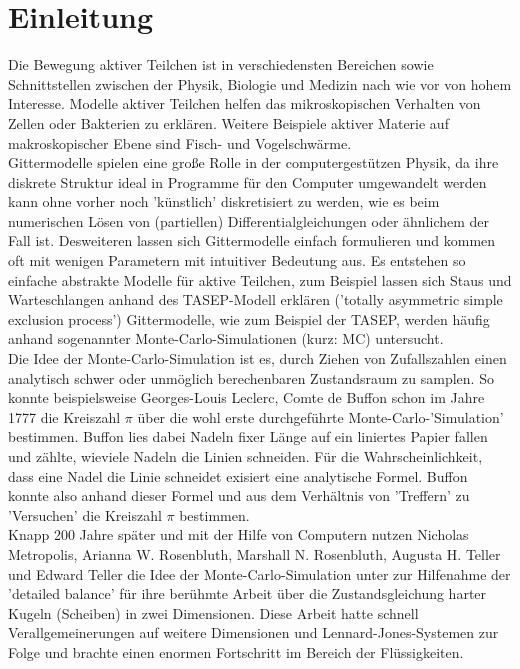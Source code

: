 \documentclass[a4paper, 12pt]{report}
\begin{document}
\chapter{Einleitung}
\renewcommand{\thepage}{\arabic{page}}\setcounter{page}{1}
Die Bewegung aktiver Teilchen ist in verschiedensten Bereichen sowie \break Schnittstellen zwischen der Physik, Biologie und Medizin nach wie vor von hohem Interesse. Modelle aktiver Teilchen helfen das mikroskopischen Verhalten von Zellen oder Bakterien zu erklären. Weitere Beispiele aktiver Materie auf makroskopischer Ebene sind Fisch- und Vogelschwärme.
\\
\noindent Gittermodelle spielen eine große Rolle in der computergestützen Physik, da ihre diskrete Struktur ideal in Programme für den Computer umgewandelt werden kann ohne vorher noch 'künstlich' diskretisiert zu werden, wie es beim numerischen Lösen von (partiellen) Differentialgleichungen oder ähnlichem der Fall ist. Desweiteren lassen sich Gittermodelle einfach formulieren und kommen oft mit wenigen Parametern mit intuitiver Bedeutung aus. Es entstehen so einfache abstrakte Modelle für aktive Teilchen, zum Beispiel lassen sich Staus und Warteschlangen anhand des TASEP-Modell erklären ('totally asymmetric simple exclusion process')\cite{Derrida_1993} Gittermodelle, wie zum Beispiel der TASEP, werden häufig anhand sogenannter Monte-Carlo-Simulationen (kurz: MC) untersucht. 
\\
\noindent Die Idee der Monte-Carlo-Simulation ist es, durch Ziehen von Zufallszahlen einen analytisch schwer oder unmöglich berechenbaren Zustandsraum zu samplen. So konnte beispielsweise Georges-Louis Leclerc, Comte de Buffon schon im Jahre 1777 die Kreiszahl $\pi$ über die wohl erste durchgeführte Monte-Carlo-'Simulation' bestimmen. Buffon lies dabei Nadeln fixer Länge auf ein liniertes Papier fallen und zählte, wieviele Nadeln die Linien schneiden. Für die Wahrscheinlichkeit, dass eine Nadel die Linie schneidet exisiert eine analytische Formel. Buffon konnte also anhand dieser Formel und aus dem Verhältnis von 'Treffern' zu 'Versuchen' die Kreiszahl $\pi$ bestimmen\cite{Buffon}. 
\\
\noindent Knapp 200 Jahre später und mit der Hilfe von Computern nutzen Nicholas Metropolis, Arianna W. Rosenbluth, Marshall N. Rosenbluth, Augusta H. Teller und Edward Teller die Idee der Monte-Carlo-Simulation unter zur Hilfenahme der 'detailed balance' für ihre berühmte Arbeit über die Zustandsgleichung harter Kugeln (Scheiben) in zwei Dimensionen\cite{doi:10.1063/1.1699114}. Diese Arbeit hatte schnell Verallgemeinerungen auf weitere Dimensionen und Lennard-Jones-Systemen\cite{doi:10.1063/1.462271} zur Folge und brachte einen enormen Fortschritt im Bereich der Flüssigkeiten.
\end{document}
